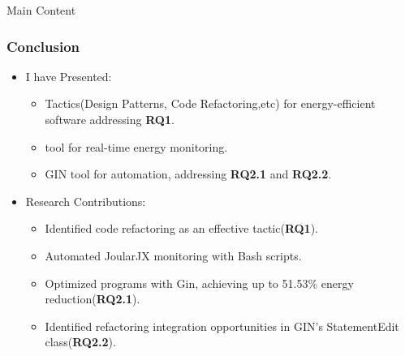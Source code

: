 \documentclass{beamer}
\begin{document}

\begin{frame}{Main Content}
 \frametitle{Conclusion}
 \vspace{-1.5cm}
 \begin{itemize}
    \item[]\footnotesize{I have Presented:}
    \begin{itemize}
        \item \footnotesize Tactics(Design Patterns, Code Refactoring,etc) for  energy-efficient software addressing \textbf{RQ1}.
        \item \footnotesize  tool for real-time energy monitoring.
        \item \footnotesize GIN tool for automation, addressing \textbf{RQ2.1} and \textbf{RQ2.2}.
    \end{itemize}
 \end{itemize}
 \vspace{1em}
\begin{itemize}
    \item[]\footnotesize{Research Contributions:}
    \begin{itemize}
        \item \footnotesize Identified code refactoring as an effective tactic(\textbf{RQ1}).
        \item \footnotesize Automated JoularJX monitoring with Bash scripts.
        \item \footnotesize Optimized programs with Gin, achieving up to 51.53\% energy reduction(\textbf{RQ2.1}).
        \item \footnotesize Identified refactoring integration opportunities in GIN's StatementEdit class(\textbf{RQ2.2}).
    \end{itemize}
\end{itemize}


 \end{frame}
\end{document}
